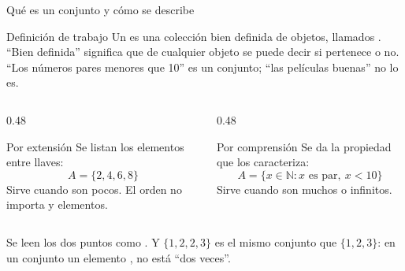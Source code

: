 \documentclass[aspectratio=169,10pt]{beamer}
\begin{document}
\begin{frame}{Qué es un conjunto y cómo se describe}
  \scriptsize
  \begin{block}{Definición de trabajo}
    \tiny
    Un  es una colección bien definida de objetos, llamados
    . ``Bien definida'' significa que de cualquier objeto se
    puede decir  si pertenece o no. ``Los números pares
    menores que 10'' es un conjunto; ``las películas buenas'' no lo es.
  \end{block}

  \vspace{0.1cm}
  \begin{columns}[T,onlytextwidth]
    \begin{column}{0.48\textwidth}
      \begin{exampleblock}{Por extensión}
        \tiny
        Se listan los elementos entre llaves:
        \[ A = \{2,4,6,8\} \]
        Sirve cuando son pocos. El orden no importa y
         elementos.
      \end{exampleblock}
    \end{column}
    \begin{column}{0.48\textwidth}
      \begin{exampleblock}{Por comprensión}
        \tiny
        Se da la propiedad que los caracteriza:
        \[ A = \{x \in \mathbb{N} : x \text{ es par},\ x<10\} \]
        Sirve cuando son muchos o infinitos.
      \end{exampleblock}
    \end{column}
  \end{columns}

  \vspace{0.1cm}
  {\tiny\color{uniGris} Se leen los dos puntos como . Y
  $\{1,2,2,3\}$ es el mismo conjunto que $\{1,2,3\}$: en un conjunto un
  elemento , no está ``dos veces''.}
\end{frame}
\end{document}
